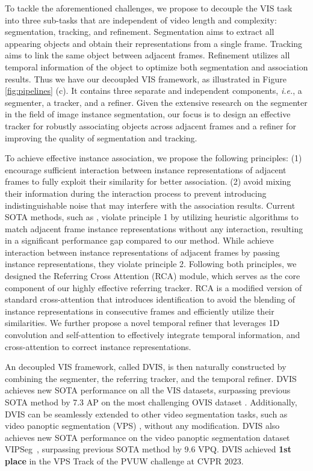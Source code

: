 \documentclass[10pt,twocolumn,letterpaper]{article}
\begin{document}
To tackle the aforementioned challenges, we propose to decouple the VIS task into three sub-tasks that are independent of video length and complexity: segmentation, tracking, and refinement. Segmentation aims to extract all appearing objects and obtain their representations from a single frame. Tracking aims to link the same object between adjacent frames. Refinement utilizes all temporal information of the object to optimize both segmentation and association results. Thus we have our decoupled VIS framework, as illustrated in Figure \ref{fig:pipelines} (c). It contains three separate and independent components, \textit{i.e.}, a segmenter, a tracker, and a refiner. Given the extensive research on the segmenter in the field of image instance segmentation, our focus is to design an effective tracker for robustly associating objects across adjacent frames and a refiner for improving the quality of segmentation and tracking. 

To achieve effective instance association, we propose the following principles: (1) encourage sufficient interaction between instance representations of adjacent frames to fully exploit their similarity for better association. (2) avoid mixing their information during the interaction process to prevent introducing indistinguishable noise that may interfere with the association results. Current SOTA methods, such as \cite{idol,minvis}, violate principle 1 by utilizing heuristic algorithms to match adjacent frame instance representations without any interaction, resulting in a significant performance gap compared to our method. While \cite{genvis,rovis} achieve interaction between instance representations of adjacent frames by passing instance representations, they violate principle 2. Following both principles, we designed the Referring Cross Attention (RCA) module, which serves as the core component of our highly effective referring tracker. RCA is a modified version of standard cross-attention \cite{detr} that introduces identification to avoid the blending of instance representations in consecutive frames and efficiently utilize their similarities.
We further propose a novel temporal refiner that leverages 1D convolution and self-attention to effectively integrate temporal information, and cross-attention to correct instance representations. 

An decoupled VIS framework, called DVIS, is then naturally constructed by combining the segmenter, the referring tracker, and the temporal refiner. DVIS achieves new SOTA performance on all the VIS datasets, surpassing previous SOTA method \cite{idol} by 7.3 AP on the most challenging OVIS dataset \cite{ovis}. Additionally, DVIS can be seamlessly extended to other video segmentation tasks, such as video panoptic segmentation (VPS) \cite{vpsnet}, without any modification. DVIS also achieves new SOTA performance on the video panoptic segmentation dataset VIPSeg~\cite{clippanofcn}, surpassing previous SOTA method \cite{tarvis} by 9.6 VPQ. DVIS achieved \textbf{1st place} in the VPS Track of the PVUW challenge at CVPR 2023.
\end{document}
